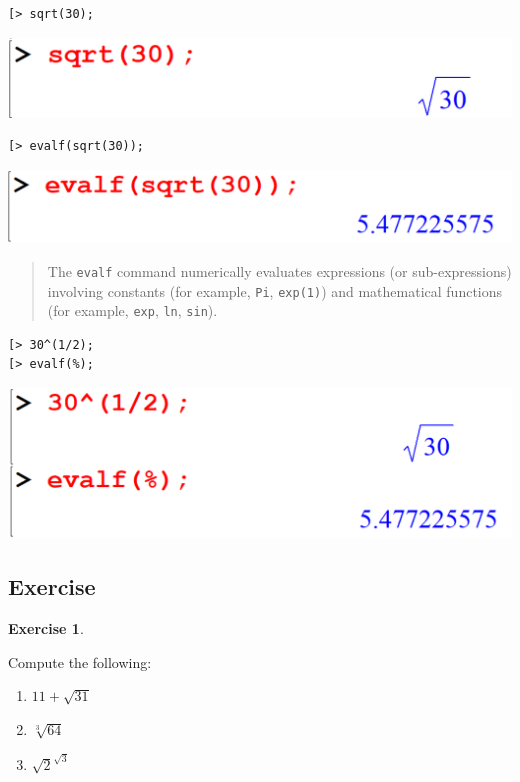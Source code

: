 \documentclass[
]{book}
\providecommand{\tightlist}{%
  \setlength{\itemsep}{0pt}\setlength{\parskip}{0pt}}
\theoremstyle{definition}
\theoremstyle{definition}
\theoremstyle{definition}
\newtheorem{exercise}{Exercise}[chapter]
\theoremstyle{definition}
\theoremstyle{remark}
\begin{document}
\begin{verbatim}
[> sqrt(30);
\end{verbatim}

\includegraphics{figures/Lesson 1/fig28.png}

\begin{verbatim}
[> evalf(sqrt(30));
\end{verbatim}

\includegraphics{figures/Lesson 1/fig29.png}

\begin{quote}
The \texttt{evalf} command numerically evaluates expressions (or sub-expressions) involving constants (for example, \texttt{Pi}, \texttt{exp(1)}) and mathematical functions (for example, \texttt{exp}, \texttt{ln}, \texttt{sin}).
\end{quote}

\begin{verbatim}
[> 30^(1/2);
[> evalf(%);
\end{verbatim}

\includegraphics{figures/Lesson 1/fig30.png}

\subsection{Exercise}\label{exercise-11}

\begin{exercise}
\protect\hypertarget{exr:unnamed-chunk-64}{}\label{exr:unnamed-chunk-64}

Compute the following:

\begin{enumerate}
\def\labelenumi{\roman{enumi}.}
\tightlist
\item
  \(11 + \sqrt{31}\)
\item
  \(\sqrt[3]{64}\)
\item
  \(\sqrt{2}^{\sqrt{3}}\)
\end{enumerate}

\end{exercise}
\end{document}
